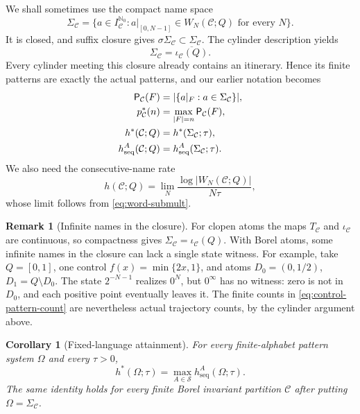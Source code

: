 \documentclass[11pt,reqno]{amsart}
\numberwithin{equation}{section}
\newtheorem{corollary}[theorem]{Corollary}
\theoremstyle{definition}
\newtheorem{remark}[theorem]{Remark}
\theoremstyle{definition}
\newcommand{\Nzero}{\mathbb N_0}
\newcommand{\C}{\mathcal C}
\newcommand{\Patt}{\mathsf P}
\newcommand{\hseq}{h_{\mathrm{seq}}}
\newcommand{\hpat}{h^{*}}
\begin{document}
We shall sometimes use the compact name space
\begin{equation}\label{eq:name-system}
 \Sigma_\C=\{a\in I_\C^{\Nzero}:
       a|_{[0,N-1]}\in W_N(\C;Q)\text{ for every }N\}.
\end{equation}
It is closed, and suffix closure gives
$\sigma\Sigma_\C\subset\Sigma_\C$. The cylinder description yields
\begin{equation}\label{eq:itinerary-closure}
 \Sigma_\C=\overline{\iota_\C(Q)}.
\end{equation}
Every cylinder meeting this closure already contains an itinerary.
Hence its finite patterns are exactly the actual patterns, and our
earlier notation becomes
\begin{align}
 \Patt_\C(F)&=|\{a|_F:a\in\Sigma_\C\}|,
       \label{eq:control-pattern-count}\\
 p_\C^*(n)&=\max_{|F|=n}\Patt_\C(F),\label{eq:pstar-control}\\
 h^*(\C;Q)&=h^*(\Sigma_\C;\tau),\label{eq:hpat-control}\\
 h_{\rm seq}^A(\C;Q)&=h_{\rm seq}^A(\Sigma_\C;\tau).
       \label{eq:hseq-control}
\end{align}
We also need the consecutive-name rate
\begin{equation}\label{eq:ordinary-partition-entropy}
 h(\C;Q)=\lim_N\frac{\log|W_N(\C;Q)|}{N\tau},
\end{equation}
whose limit follows from \eqref{eq:word-submult}.

\begin{remark}[Infinite names in the closure]\label{rem:witness}
For clopen atoms the maps $T_\C$ and $\iota_\C$ are continuous,
so compactness gives $\Sigma_\C=\iota_\C(Q)$. With Borel atoms,
some infinite names in the closure can lack a single state witness.
For example, take $Q=[0,1]$, one control $f(x)=\min\{2x,1\}$,
and atoms $D_0=(0,1/2)$, $D_1=Q\setminus D_0$. The state
$2^{-N-1}$ realizes $0^N$, but $0^\infty$ has no witness:
zero is not in $D_0$, and each positive point eventually leaves it.
The finite counts in \eqref{eq:control-pattern-count} are nevertheless
actual trajectory counts, by the cylinder argument above.
\end{remark}

\begin{corollary}[Fixed-language attainment]\label{cor:fixed}
For every finite-alphabet pattern system $\Omega$ and every $\tau>0$,
\begin{equation}\label{eq:fixed-attainment}
 \hpat(\Omega;\tau)=\max_{A\in\mathscr S}\hseq^A(\Omega;\tau).
\end{equation}
The same identity holds for every finite Borel invariant partition $\C$ after
putting $\Omega=\Sigma_\C$.
\end{corollary}
\end{document}
